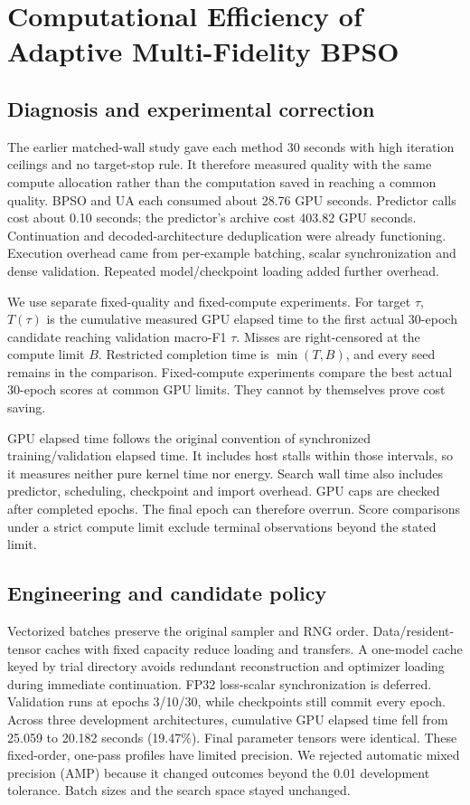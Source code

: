 \chapter{Computational Efficiency of Adaptive Multi-Fidelity BPSO}
\label{sec:amf-efficiency}
\section{Diagnosis and experimental correction}
The earlier matched-wall study gave each method 30 seconds with high iteration ceilings and no target-stop rule. It therefore measured quality with the same compute allocation rather than the computation saved in reaching a common quality. BPSO and UA each consumed about 28.76 GPU seconds. Predictor calls cost about 0.10 seconds; the predictor's archive cost 403.82 GPU seconds. Continuation and decoded-architecture deduplication were already functioning. Execution overhead came from per-example batching, scalar synchronization and dense validation. Repeated model/checkpoint loading added further overhead.

We use separate fixed-quality and fixed-compute experiments. For target $\tau$, $T(\tau)$ is the cumulative measured GPU elapsed time to the first actual 30-epoch candidate reaching validation macro-F1 $\tau$. Misses are right-censored at the compute limit $B$. Restricted completion time is $\min(T,B)$, and every seed remains in the comparison. Fixed-compute experiments compare the best actual 30-epoch scores at common GPU limits. They cannot by themselves prove cost saving.

GPU elapsed time follows the original convention of synchronized training/validation elapsed time. It includes host stalls within those intervals, so it measures neither pure kernel time nor energy. Search wall time also includes predictor, scheduling, checkpoint and import overhead. GPU caps are checked after completed epochs. The final epoch can therefore overrun. Score comparisons under a strict compute limit exclude terminal observations beyond the stated limit.

\section{Engineering and candidate policy}
Vectorized batches preserve the original sampler and RNG order. Data/resident-tensor caches with fixed capacity reduce loading and transfers. A one-model cache keyed by trial directory avoids redundant reconstruction and optimizer loading during immediate continuation. FP32 loss-scalar synchronization is deferred. Validation runs at epochs 3/10/30, while checkpoints still commit every epoch. Across three development architectures, cumulative GPU elapsed time fell from 25.059 to 20.182 seconds (19.47\%). Final parameter tensors were identical. These fixed-order, one-pass profiles have limited precision. We rejected automatic mixed precision (AMP) because it changed outcomes beyond the 0.01 development tolerance. Batch sizes and the search space stayed unchanged.

